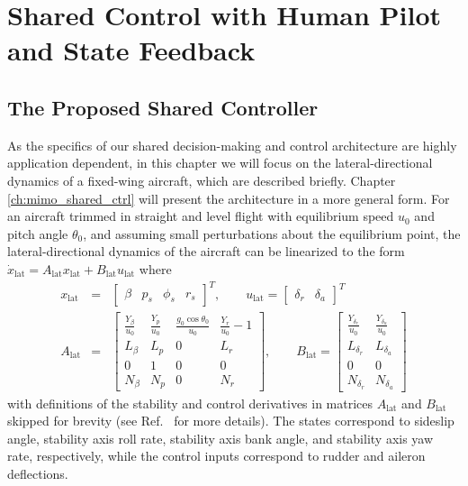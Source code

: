 \chapter{Shared Control with Human Pilot and State Feedback} \label{ch:siso_shared_ctrl}

\section{The Proposed Shared Controller} \label{sec:shared}
As the specifics of our shared decision-making and control architecture are highly application dependent, in this chapter we will focus on the lateral-directional dynamics of a fixed-wing aircraft, which are described briefly. Chapter \ref{ch:mimo_shared_ctrl} will present the architecture in a more general form. For an aircraft trimmed in straight and level flight with equilibrium speed $u_0$ and pitch angle $\theta_0$, and assuming small perturbations about the equilibrium point, the lateral-directional dynamics of the aircraft can be linearized to the form $\dot{x}_{\mathrm{lat}} = A_{\mathrm{lat}} x_{\mathrm{lat}} + B_{\mathrm{lat}} u_{\mathrm{lat}}$ where
\begin{eqnarray}
	x_{\mathrm{lat}} &=& \begin{bmatrix}\beta & p_s & \phi_s & r_s \end{bmatrix}^T, \qquad u_{\mathrm{lat}} = \begin{bmatrix}\delta_r & \delta_a \end{bmatrix}^T \nonumber \\
	A_{\mathrm{lat}} &=& \begin{bmatrix}
			\frac{Y_\beta}{u_0} & \frac{Y_p}{u_0} & \frac{g_0\cos{\theta_0}}{u_0} & \frac{Y_r}{u_0} - 1 \\
			L_\beta & L_p & 0 & L_r \\
			0 & 1 & 0 & 0 \\
			N_\beta & N_p & 0 & N_r
		\end{bmatrix}, \qquad B_{\mathrm{lat}} = \begin{bmatrix}
			\frac{Y_{\delta_r}}{u_0} & \frac{Y_{\delta_a}}{u_0} \\
			L_{\delta_r} & L_{\delta_a} \\
			0 & 0 \\
			N_{\delta_r} & N_{\delta_a} 
		\end{bmatrix}
\end{eqnarray}
\noindent with definitions of the stability and control derivatives in matrices $A_{\mathrm{lat}}$ and $B_{\mathrm{lat}}$ skipped for brevity (see Ref.~\cite{lavretsky2013robust} for more details). The states correspond to sideslip angle, stability axis roll rate, stability axis bank angle, and stability axis yaw rate, respectively, while the control inputs correspond to rudder and aileron deflections.


